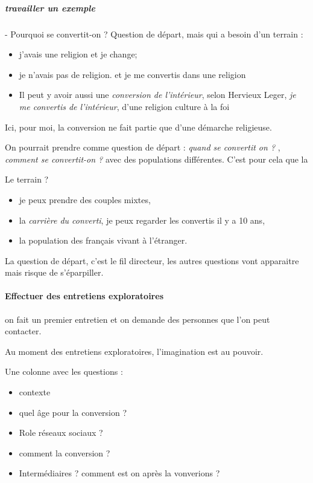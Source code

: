 \subparagraph{travailler un exemple}
\begin{Ex}[conversion]
- Pourquoi se convertit-on ?
Question de départ, mais qui a besoin d'un terrain : 
\begin{itemize}
\item j'avais une religion et je change; 
\item je n'avais pas de religion. et je me convertis dans une religion
\item Il peut y avoir aussi une \textit{conversion de l'intérieur}, selon Hervieux Leger, \textit{je me convertis de l'intérieur}, d'une religion culture à la foi

\end{itemize}
Ici, pour moi, la conversion ne fait partie que d'une démarche religieuse. 

On pourrait prendre comme question de départ : \textit{quand se convertit on ? }, \textit{comment se convertit-on ?}
avec des populations différentes. C'est pour cela que la

Le terrain ? 

\begin{itemize}
\item je peux prendre des couples mixtes, 
\item la \textit{carrière du converti}, je peux regarder les convertis il y a 10 ans, 
\item la population des français vivant à l'étranger.
\end{itemize} 
La question de départ, c'est le fil directeur, les autres questions vont apparaitre mais risque de s'éparpiller.
\end{Ex}


\paragraph{Effectuer des entretiens exploratoires }

\begin{Def}
on fait un premier entretien et on demande des personnes que l'on peut contacter.
\end{Def}


Au moment des entretiens exploratoires, l'imagination est au pouvoir. 

Une colonne avec les questions : 
\begin{itemize}
\item contexte
\item quel âge pour la conversion ?
\item Role réseaux sociaux ?
\item comment la conversion ?
\item Intermédiaires ?
\iitem comment est on après la vonverions ?
\end{itemize}

